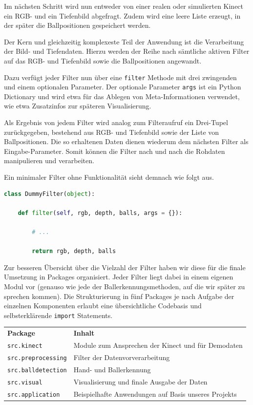 \documentclass[12pt,a4paper,ngerman]{scrartcl}
\begin{document}
Im nächsten Schritt wird nun entweder von einer realen oder simulierten Kinect ein RGB- und ein Tiefenbild abgefragt. Zudem wird eine leere Liste erzeugt, in der später die Ballpositionen gespeichert werden.

Der Kern und gleichzeitig komplexeste Teil der Anwendung ist die Verarbeitung der Bild- und Tiefendaten.
Hierzu werden der Reihe nach sämtliche aktiven Filter auf das RGB- und Tiefenbild sowie die Ballpositionen angewandt.

Dazu verfügt jeder Filter nun über eine \lstinline{filter} Methode mit drei zwingenden und einem optionalen
Parameter. Der optionale Parameter \lstinline{args} ist ein Python Dictionary und wird etwa für das 
Ablegen von Meta-Informationen verwendet, wie etwa Zusatzinfos zur späteren Visualisierung.

Als Ergebnis von jedem Filter wird analog zum Filteraufruf ein Drei-Tupel zurückgegeben, bestehend aus RGB- und Tiefenbild sowie der Liste von Ballpositionen. Die so erhaltenen Daten dienen wiederum dem nächsten Filter als Eingabe-Parameter. Somit können die Filter nach und nach die Rohdaten manipulieren und verarbeiten.

Ein minimaler Filter ohne Funktionalität sieht demnach wie folgt aus.

\begin{lstlisting}[language=Python,caption={Grundstruktur eines Filters. In diesem Beispiel werden die Eingabedaten unverändert zurückgegeben.}]
class DummyFilter(object):

    def filter(self, rgb, depth, balls, args = {}):

        # ...

        return rgb, depth, balls
\end{lstlisting}

Zur besseren Übersicht über die Vielzahl der Filter haben wir diese für die finale Umsetzung in Packages organisiert. Jeder Filter liegt dabei in einem eigenen Modul vor (genauso wie jede der Ballerkennungsmethoden, auf die wir später zu sprechen kommen). Die Strukturierung in fünf Packages je nach Aufgabe der einzelnen Komponenten erlaubt eine übersichtliche Codebasis und selbsterklärende \lstinline{import} Statements.

\begin{tabular}{ll}
\textbf{Package} & \textbf{Inhalt} \vspace{0.1cm} \\
{\lstinline!src.kinect!} & Module zum Ansprechen der Kinect und für Demodaten \\
{\lstinline!src.preprocessing!} & Filter der Datenvorverarbeitung\\
{\lstinline!src.balldetection!} & Hand- und Ballerkennung\\
{\lstinline!src.visual!} & Visualisierung und finale Ausgabe der Daten\\
{\lstinline!src.application!} & Beispielhafte Anwendungen auf Basis unseres Projekts
\end{tabular}
\end{document}
